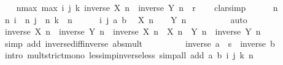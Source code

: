 \begin{isabellebody}
\isanewline
\ \ \isamarkupfalse%
\ {\isachardoublequoteopen}{\isasymforall}n{\isasymge}max\ {\isacharparenleft}{\kern0pt}max\ i\ j{\isacharparenright}{\kern0pt}\ k{\isachardot}{\kern0pt}\ {\isasymbar}inverse\ {\isacharparenleft}{\kern0pt}X\ n{\isacharparenright}{\kern0pt}\ {\isacharminus}{\kern0pt}\ inverse\ {\isacharparenleft}{\kern0pt}Y\ n{\isacharparenright}{\kern0pt}{\isasymbar}\ {\isacharless}{\kern0pt}\ r{\isachardoublequoteclose}\isanewline
\ \ \isamarkupfalse%
\ clarsimp\isanewline
\ \ \ \ \isamarkupfalse%
\ n\isanewline
\ \ \ \ \isamarkupfalse%
\ n{\isacharcolon}{\kern0pt}\ {\isachardoublequoteopen}i\ {\isasymle}\ n{\isachardoublequoteclose}\ {\isachardoublequoteopen}j\ {\isasymle}\ n{\isachardoublequoteclose}\ {\isachardoublequoteopen}k\ {\isasymle}\ n{\isachardoublequoteclose}\isanewline
\ \ \ \ \isamarkupfalse%
\ i\ j\ a\ b\ \isamarkupfalse%
\ {\isachardoublequoteopen}X\ n\ {\isasymnoteq}\ {}{\isachardoublequoteclose}\ \ {\isachardoublequoteopen}Y\ n\ {\isasymnoteq}\ {}{\isachardoublequoteclose}\isanewline
\ \ \ \ \ \ \isamarkupfalse%
\ auto\isanewline
\ \ \ \ \isamarkupfalse%
\ \isamarkupfalse%
\ {\isachardoublequoteopen}{\isasymbar}inverse\ {\isacharparenleft}{\kern0pt}X\ n{\isacharparenright}{\kern0pt}\ {\isacharminus}{\kern0pt}\ inverse\ {\isacharparenleft}{\kern0pt}Y\ n{\isacharparenright}{\kern0pt}{\isasymbar}\ {\isacharequal}{\kern0pt}\ inverse\ {\isasymbar}X\ n{\isasymbar}\ {\isacharasterisk}{\kern0pt}\ {\isasymbar}X\ n\ {\isacharminus}{\kern0pt}\ Y\ n{\isasymbar}\ {\isacharasterisk}{\kern0pt}\ inverse\ {\isasymbar}Y\ n{\isasymbar}{\isachardoublequoteclose}\isanewline
\ \ \ \ \ \ \isamarkupfalse%
\ {\isacharparenleft}{\kern0pt}simp\ add{\isacharcolon}{\kern0pt}\ inverse{\isacharunderscore}{\kern0pt}diff{\isacharunderscore}{\kern0pt}inverse\ abs{\isacharunderscore}{\kern0pt}mult{\isacharparenright}{\kern0pt}\isanewline
\ \ \ \ \isamarkupfalse%
\ \isamarkupfalse%
\ {\isachardoublequoteopen}{\isasymdots}\ {\isacharless}{\kern0pt}\ inverse\ a\ {\isacharasterisk}{\kern0pt}\ s\ {\isacharasterisk}{\kern0pt}\ inverse\ b{\isachardoublequoteclose}\isanewline
\ \ \ \ \ \ \isamarkupfalse%
\ {\isacharparenleft}{\kern0pt}intro\ mult{\isacharunderscore}{\kern0pt}strict{\isacharunderscore}{\kern0pt}mono{\isacharprime}{\kern0pt}\ less{\isacharunderscore}{\kern0pt}imp{\isacharunderscore}{\kern0pt}inverse{\isacharunderscore}{\kern0pt}less{\isacharparenright}{\kern0pt}\ {\isacharparenleft}{\kern0pt}simp{\isacharunderscore}{\kern0pt}all\ add{\isacharcolon}{\kern0pt}\ a\ b\ i\ j\ k\ n{\isacharparenright}{\kern0pt}\isanewline

\end{isabellebody}
